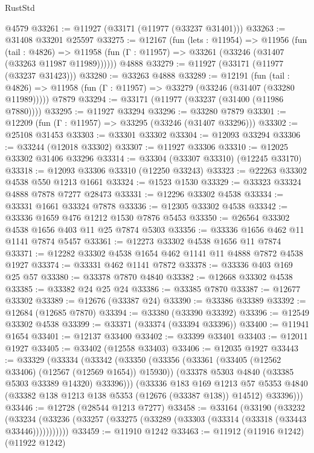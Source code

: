 \begin{lexlean}{RustStd}
\begin{coremodule}
    @4579
@33261 := @11927 (@33171 (@11977 (@33237 @31401)))
@33263 := @31408 @33201 @25597
@33275 := @12167
    (fun (lets : @11954) =>
    @11956
      (fun (tail : @4826) =>
      @11958 (fun (Γ : @11957) => @33261 (@33246 (@31407 (@33263 @11987 @11989))))))
    @4888
@33279 := @11927 (@33171 (@11977 (@33237 @31423)))
@33280 := @33263 @4888
@33289 := @12191
    (fun (tail : @4826) => @11958 (fun (Γ : @11957) => @33279 (@33246 (@31407 (@33280 @11989)))))
    @7879
@33294 := @33171 (@11977 (@33237 (@31400 (@11986 @7880))))
@33295 := @11927 @33294
@33296 := @33280 @7879
@33301 := @12209 (fun (Γ : @11957) => @33295 (@33246 (@31407 @33296)))
@33302 := @25108 @31453
@33303 := @33301 @33302
@33304 := @12093 @33294
@33306 := @33244 (@12018 @33302)
@33307 := @11927 @33306
@33310 := @12025 @33302 @31406 @33296
@33314 := @33304 (@33307 @33310) (@12245 @33170)
@33318 := @12093 @33306 @33310 (@12250 @33243)
@33323 := @22263 @33302 @4538 @550 @1213 @1661
@33324 := @1523 @1530
@33329 := @33323 @33324 @4888 @7878 @7277 @28473
@33331 := @12296 @33302 @4538
@33334 := @33331 @1661 @33324 @7878
@33336 := @12305 @33302 @4538
@33342 := @33336 @1659 @476 @1212 @1530 @7876 @5453
@33350 := @26564 @33302 @4538 @1656 @403 @11 @25 @7874 @5303
@33356 := @33336 @1656 @462 @11 @1141 @7874 @5457
@33361 := @12273 @33302 @4538 @1656 @11 @7874
@33371 := @12282 @33302 @4538 @1654 @462 @1141 @11 @4888 @7872 @4538 @1927
@33374 := @33331 @462 @1141 @7872
@33378 := @33336 @403 @169 @25 @57
@33380 := @33378 @7870 @4840
@33382 := @12668 @33302 @4538
@33385 := @33382 @24 @25 @24
@33386 := @33385 @7870
@33387 := @12677 @33302
@33389 := @12676 (@33387 @24)
@33390 := @33386 @33389
@33392 := @12684 (@12685 @7870)
@33394 := @33380 (@33390 @33392)
@33396 := @12549 @33302 @4538
@33399 := @33371 (@33374 (@33394 @33396))
@33400 := @11941 @1654
@33401 := @12137 @33400
@33402 := @33399 @33401
@33403 := @12011 @1927
@33405 := @33402 (@12558 @33403)
@33406 := @12035 @1927
@33443 := @33329
    (@33334
      (@33342
        (@33350
          (@33356
            (@33361 (@33405 (@12562 @33406) (@12567 (@12569 @1654)) @15930))
            (@33378 @5303 @4840 (@33385 @5303 @33389 @14320) @33396)))
        (@33336
          @183
          @169
          @1213
          @57
          @5353
          @4840
          (@33382 @138 @1213 @138 @5353 (@12676 (@33387 @138)) @14512)
          @33396)))
@33446 := @12728 (@28544 @1213 @7277)
@33458 := @33164
    (@33190
      (@33232
        (@33234 (@33236 (@33257 (@33275 (@33289 (@33303 (@33314 (@33318 (@33443 @33446)))))))))))
@33459 := @11910 @1242
@33463 := @11912 (@11916 @1242) (@11922 @1242)

\end{coremodule}
\end{lexlean}
